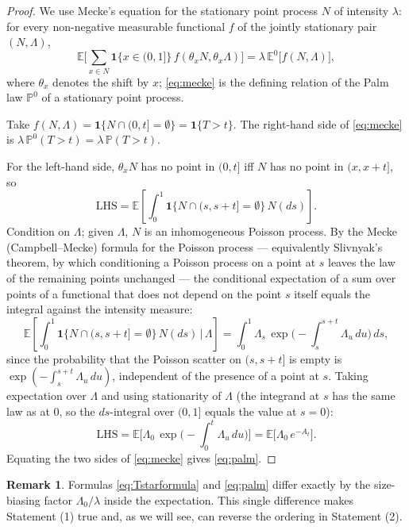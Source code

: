 \documentclass{amsart}
\theoremstyle{plain}
\theoremstyle{definition}
\newtheorem{remark}{Remark}
\newcommand{\E}{\mathbb{E}}
\newcommand{\Prob}{\mathbb{P}}
\newcommand{\Lam}{\Lambda}
\begin{document}
\begin{proof}
We use Mecke's equation for the stationary point process $N$ of intensity $\lambda$:
for every non-negative measurable functional $f$ of the jointly stationary pair
$(N,\Lam)$,
\begin{equation}\label{eq:mecke}
  \E\Big[\sum_{x\in N}\mathbf1\{x\in(0,1]\}\,f(\theta_xN,\theta_x\Lam)\Big]
   =\lambda\,\E^0\big[f(N,\Lam)\big],
\end{equation}
where $\theta_x$ denotes the shift by $x$; \eqref{eq:mecke} is the defining relation
of the Palm law $\Prob^0$ of a stationary point process.

Take $f(N,\Lam)=\mathbf1\{N\cap(0,t]=\emptyset\}=\mathbf1\{T>t\}$. The right-hand side
of \eqref{eq:mecke} is $\lambda\,\Prob^0(T>t)=\lambda\,\Prob(T>t)$.

For the left-hand side, $\theta_xN$ has no point in $(0,t]$ iff $N$ has no point in
$(x,x+t]$, so
\[
  \text{LHS}=\E\!\left[\int_0^1\mathbf1\{N\cap(s,s+t]=\emptyset\}\,N(ds)\right].
\]
Condition on $\Lam$; given $\Lam$, $N$ is an inhomogeneous Poisson process. By the
Mecke (Campbell--Mecke) formula for the Poisson process — equivalently Slivnyak's
theorem, by which conditioning a Poisson process on a point at $s$ leaves the law of
the remaining points unchanged — the conditional expectation of a sum over points of a
functional that does not depend on the point $s$ itself equals the integral against the
intensity measure:
\[
  \E\!\left[\int_0^1\mathbf1\{N\cap(s,s+t]=\emptyset\}\,N(ds)\,\Big|\,\Lam\right]
   =\int_0^1\Lam_s\,\exp\!\Big(-\int_s^{s+t}\Lam_u\,du\Big)\,ds ,
\]
since the probability that the Poisson scatter on $(s,s+t]$ is empty is
$\exp(-\int_s^{s+t}\Lam_u\,du)$, independent of the presence of a point at $s$. Taking
expectation over $\Lam$ and using stationarity of $\Lam$ (the integrand at $s$ has the
same law as at $0$, so the $ds$-integral over $(0,1]$ equals the value at $s=0$):
\[
  \text{LHS}=\E\!\Big[\Lam_0\,\exp\!\Big(-\int_0^t\Lam_u\,du\Big)\Big]
            =\E\big[\Lam_0\,e^{-A_t}\big].
\]
Equating the two sides of \eqref{eq:mecke} gives \eqref{eq:palm}.
\end{proof}

\begin{remark}
Formulas \eqref{eq:Tstarformula} and \eqref{eq:palm} differ exactly by the
size-biasing factor $\Lam_0/\lambda$ inside the expectation. This single difference
makes Statement (1) true and, as we will see, can reverse the ordering in Statement
(2).
\end{remark}
\end{document}
